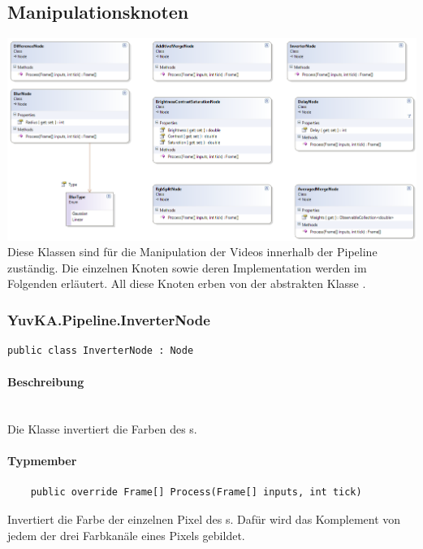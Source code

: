 \subsection{Manipulationsknoten}

\includegraphics[width=\textwidth]{YuvKA.Pipeline/manipulationnodes.png}
Diese Klassen sind für die Manipulation der Videos innerhalb der Pipeline zuständig. Die einzelnen Knoten sowie deren Implementation werden im Folgenden erläutert. All diese Knoten erben von der abstrakten Klasse .

\subsubsection{YuvKA.Pipeline.InverterNode}
\begin{verbatim}
public class InverterNode : Node
\end{verbatim}

\paragraph{Beschreibung}~\\
Die Klasse  invertiert die Farben des s.

\paragraph{Typmember}
\begin{itemize}

	\begin{verbatim}
	public override Frame[] Process(Frame[] inputs, int tick)
	\end{verbatim}
	Invertiert die Farbe der einzelnen Pixel des s. Dafür wird das Komplement von jedem der drei Farbkanäle eines Pixels gebildet.

\end{itemize}


